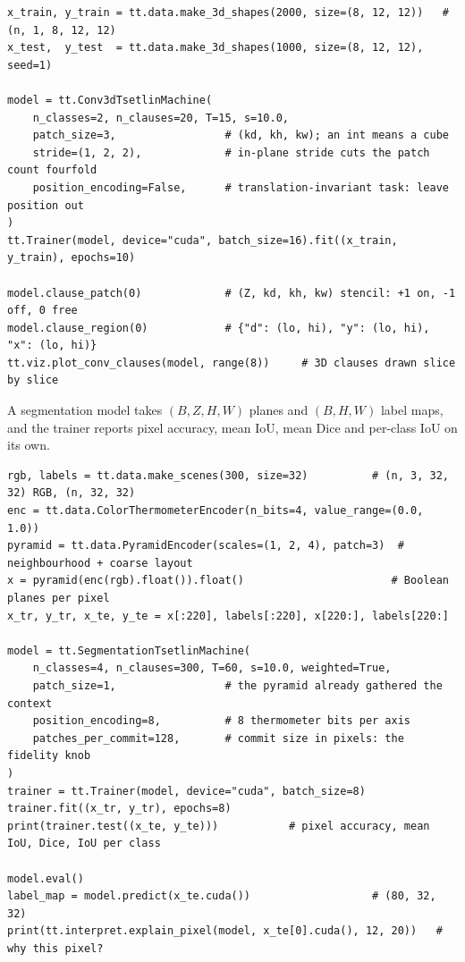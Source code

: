 \begin{lstlisting}[style=ttpython]
x_train, y_train = tt.data.make_3d_shapes(2000, size=(8, 12, 12))   # (n, 1, 8, 12, 12)
x_test,  y_test  = tt.data.make_3d_shapes(1000, size=(8, 12, 12), seed=1)

model = tt.Conv3dTsetlinMachine(
    n_classes=2, n_clauses=20, T=15, s=10.0,
    patch_size=3,                 # (kd, kh, kw); an int means a cube
    stride=(1, 2, 2),             # in-plane stride cuts the patch count fourfold
    position_encoding=False,      # translation-invariant task: leave position out
)
tt.Trainer(model, device="cuda", batch_size=16).fit((x_train, y_train), epochs=10)

model.clause_patch(0)             # (Z, kd, kh, kw) stencil: +1 on, -1 off, 0 free
model.clause_region(0)            # {"d": (lo, hi), "y": (lo, hi), "x": (lo, hi)}
tt.viz.plot_conv_clauses(model, range(8))     # 3D clauses drawn slice by slice
\end{lstlisting}

A segmentation model takes $(B, Z, H, W)$ planes and $(B, H, W)$ label maps, and the
trainer reports pixel accuracy, mean IoU, mean Dice and per-class IoU on its own.

\begin{lstlisting}[style=ttpython]
rgb, labels = tt.data.make_scenes(300, size=32)          # (n, 3, 32, 32) RGB, (n, 32, 32)
enc = tt.data.ColorThermometerEncoder(n_bits=4, value_range=(0.0, 1.0))
pyramid = tt.data.PyramidEncoder(scales=(1, 2, 4), patch=3)  # neighbourhood + coarse layout
x = pyramid(enc(rgb).float()).float()                       # Boolean planes per pixel
x_tr, y_tr, x_te, y_te = x[:220], labels[:220], x[220:], labels[220:]

model = tt.SegmentationTsetlinMachine(
    n_classes=4, n_clauses=300, T=60, s=10.0, weighted=True,
    patch_size=1,                 # the pyramid already gathered the context
    position_encoding=8,          # 8 thermometer bits per axis
    patches_per_commit=128,       # commit size in pixels: the fidelity knob
)
trainer = tt.Trainer(model, device="cuda", batch_size=8)
trainer.fit((x_tr, y_tr), epochs=8)
print(trainer.test((x_te, y_te)))           # pixel accuracy, mean IoU, Dice, IoU per class

model.eval()
label_map = model.predict(x_te.cuda())                   # (80, 32, 32)
print(tt.interpret.explain_pixel(model, x_te[0].cuda(), 12, 20))   # why this pixel?
\end{lstlisting}

